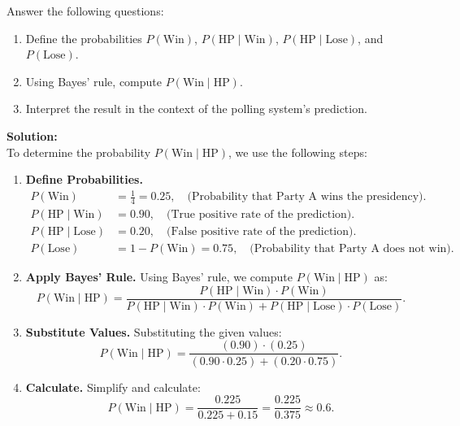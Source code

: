 \documentclass[12pt]{article}
\newif\ifsolutions
\begin{document}
\begin{enumerate}
    Answer the following questions:
    \begin{enumerate}[label=(\alph*)]
        \item Define the probabilities \(P(\text{Win})\), \(P(\text{HP} \mid \text{Win})\), \(P(\text{HP} \mid \text{Lose})\), and \(P(\text{Lose})\).
        \item Using Bayes' rule, compute \(P(\text{Win} \mid \text{HP})\).
        \item Interpret the result in the context of the polling system's prediction.
    \end{enumerate}
    
    \ifsolutions \color{blue} \textbf{Solution:} \\
    To determine the probability \(P(\text{Win} \mid \text{HP})\), we use the following steps:
    
    \begin{enumerate}
        \item \textbf{Define Probabilities.}
        \begin{align*}
            P(\text{Win}) &= \frac{1}{4} = 0.25, \quad \text{(Probability that Party A wins the presidency)}. \\
            P(\text{HP} \mid \text{Win}) &= 0.90, \quad \text{(True positive rate of the prediction)}. \\
            P(\text{HP} \mid \text{Lose}) &= 0.20, \quad \text{(False positive rate of the prediction)}. \\
            P(\text{Lose}) &= 1 - P(\text{Win}) = 0.75, \quad \text{(Probability that Party A does not win)}.
        \end{align*}
    
        \item \textbf{Apply Bayes' Rule.}
        Using Bayes' rule, we compute \(P(\text{Win} \mid \text{HP})\) as:
        \[
        P(\text{Win} \mid \text{HP}) = \frac{P(\text{HP} \mid \text{Win}) \cdot P(\text{Win})}{P(\text{HP} \mid \text{Win}) \cdot P(\text{Win}) + P(\text{HP} \mid \text{Lose}) \cdot P(\text{Lose})}.
        \]
    
        \item \textbf{Substitute Values.}
        Substituting the given values:
        \[
        P(\text{Win} \mid \text{HP}) = \frac{(0.90) \cdot (0.25)}{(0.90 \cdot 0.25) + (0.20 \cdot 0.75)}.
        \]
    
        \item \textbf{Calculate.}
        Simplify and calculate:
        \[
        P(\text{Win} \mid \text{HP}) = \frac{0.225}{0.225 + 0.15} = \frac{0.225}{0.375} \approx 0.6.
        \]
    

\end{enumerate}
\end{enumerate}
\end{document}
